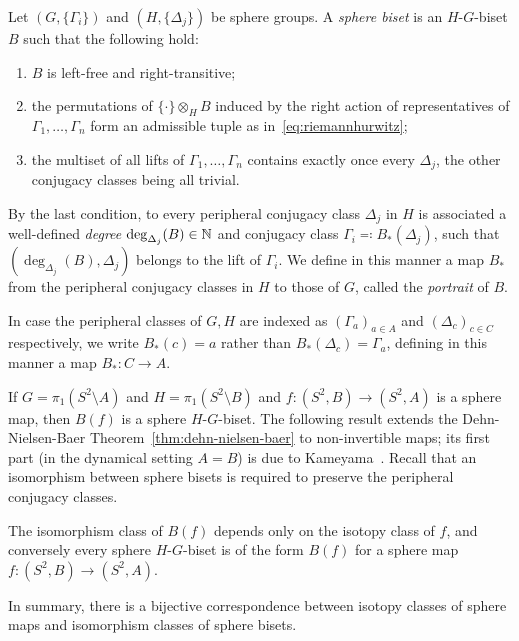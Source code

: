 \documentclass{amsart}
\begin{document}
\begin{defn}\label{defn:sphere bisets}
  Let $(G,\{\Gamma_i\})$ and $(H,\{\Delta_j\})$ be sphere groups. A
  \emph{sphere biset} is an $H$-$G$-biset $B$ such that the following
  hold:
  \begin{enumerate}
  \item $B$ is left-free and right-transitive;
  \item the permutations of $\{\cdot\}\otimes_H B$ induced by the
    right action of representatives of $\Gamma_1,\dots,\Gamma_n$ form
    an admissible tuple as in~\eqref{eq:riemannhurwitz};
  \item the multiset of all lifts of $\Gamma_1,\dots,\Gamma_n$
    contains exactly once every $\Delta_j$, the other conjugacy
    classes being all trivial.
  \end{enumerate}
  By the last condition, to every peripheral conjugacy class
  $\Delta_j$ in $H$ is associated a well-defined \emph{degree}
  $\deg_{\Delta_j}(B)\in{\mathbb N}$ and conjugacy class
  $\Gamma_i\eqqcolon B_*(\Delta_j)$, such that
  $(\deg_{\Delta_j}(B),\Delta_j)$ belongs to the lift of
  $\Gamma_i$. We define in this manner a map $B_*$ from the peripheral
  conjugacy classes in $H$ to those of $G$, called the \emph{portrait}
  of $B$.
\end{defn}
In case the peripheral classes of $G,H$ are indexed as
$(\Gamma_a)_{a\in A}$ and $(\Delta_c)_{c\in C}$ respectively, we write
$B_*(c)=a$ rather than $B_*(\Delta_c)=\Gamma_a$, defining in this
manner a map $B_*\colon C\to A$.

If $G=\pi_1(S^2\setminus A)$ and $H=\pi_1(S^2\setminus B)$ and
$f\colon(S^2,B)\to(S^2,A)$ is a sphere map, then $B(f)$ is a sphere
$H$-$G$-biset. The following result extends the Dehn-Nielsen-Baer
Theorem~\ref{thm:dehn-nielsen-baer} to non-invertible maps; its first
 part (in the dynamical setting $A=B$) is due to
 Kameyama~\cite{kameyama:thurston}. Recall that an isomorphism between sphere
bisets is required to preserve the peripheral conjugacy classes.
\begin{thm}
  The isomorphism class of $B(f)$ depends only on the isotopy class of
  $f$, and conversely every sphere $H$-$G$-biset is of the form $B(f)$
  for a sphere map $f\colon(S^2,B)\to(S^2,A)$.
\end{thm}
In summary, there is a bijective correspondence between isotopy
classes of sphere maps and isomorphism classes of sphere bisets.
\end{document}

